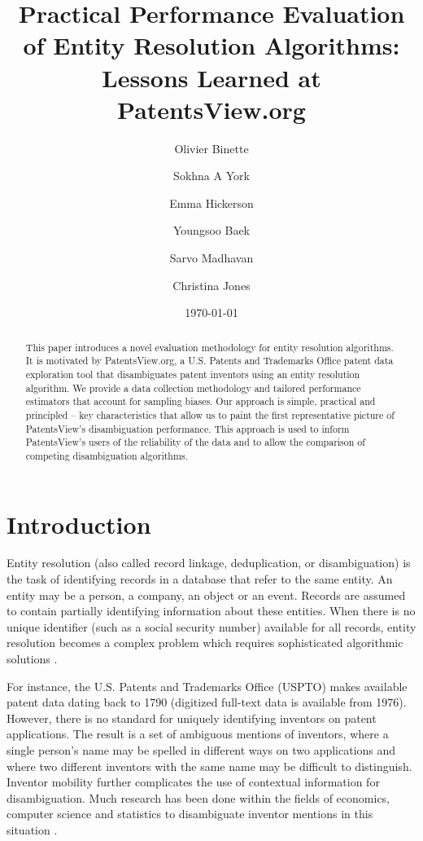 \documentclass[fontsize=11pt]{article}
\title{Practical Performance Evaluation of Entity Resolution Algorithms: Lessons Learned at PatentsView.org}
\author[1,2]{Olivier Binette}
\author[2]{Sokhna A York}
\author[2]{Emma Hickerson}
\author[1]{Youngsoo Baek}
\author[2]{Sarvo Madhavan}
\author[2]{Christina Jones}
\affil[1]{Duke University}
\affil[2]{American Institutes for Research}
\date{\today}
\newcommand{\ob}[1]{{#1}}
\theoremstyle{definition}
\begin{document}
\maketitle

\begin{abstract}
This paper introduces a novel evaluation methodology for entity resolution algorithms. It is motivated by PatentsView.org, a {U.S. Patents and Trademarks Office patent data exploration tool} that disambiguates patent inventors using an entity resolution algorithm. We provide a data collection methodology and tailored performance estimators that account for sampling biases. Our approach is simple, practical and principled -- key characteristics that allow us to paint the first representative picture of PatentsView's disambiguation performance. This approach is used to inform PatentsView's users of the reliability of the data and to allow the comparison of competing disambiguation algorithms.
\end{abstract}

\section{Introduction}
Entity resolution (also called record linkage, deduplication, or disambiguation) is the task of identifying records in a database that refer to the same entity. An entity may be a person, a company, an object or an event. Records are assumed to contain partially identifying information about these entities. When there is no unique identifier (such as a social security number) available for all records, entity resolution becomes a complex problem which requires sophisticated algorithmic solutions \citep{Herzog2007, Christen2012, Dong2015, Ilyas2019, Christophides2019, Christen2019, Papadakis2021, Binette2022a}. 

For instance, the U.S. Patents and Trademarks Office (USPTO) makes available patent data dating back to 1790 \ob{(digitized full-text data is available from 1976)}. However, there is no standard for uniquely identifying inventors on patent applications. The result is a set of ambiguous mentions of inventors, where a single person's name may be spelled in different ways on two applications and where two different inventors with the same name may be difficult to distinguish. \ob{Inventor mobility further complicates the use of contextual information for disambiguation.} Much research has been done within the fields of economics, computer science and statistics to disambiguate inventor mentions \ob{in this situation} \citep{trajtenberg2008identification, ferreira2012brief, ventura2013methods, Li2014, Ventura2015, kim2016random, yang2017mixture, morrison2017disambiguation, muller2017semantic, traylor2017learning, balsmeier2018machine,tam2019optimal, monath2019scalable, doherr2021disambiguation}.
\end{document}
